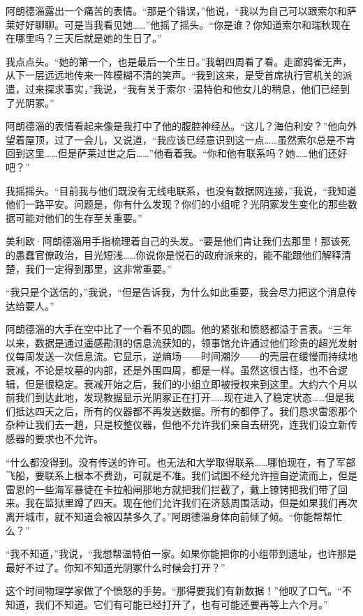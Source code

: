 \documentclass[AutoFakeBold=true]{book}
\begin{document}
阿朗德淄露出一个痛苦的表情。``那是个错误，''他说，``我以为自己可以跟索尔和萨莱好好聊聊。可是当我看见她……''他摇了摇头。``你是谁？你知道索尔和瑞秋现在在哪里吗？{\kaishu 三天}后就是她的生日了。''

我点点头。``她的第一个，也是最后一个生日。''我朝四周看了看。走廊鸦雀无声，从下一层远远地传来一阵模糊不清的笑声。``我到这来，是受首席执行官机关的派遣，过来探求事实，''我说，``我有关于索尔·温特伯和他女儿的稍息，他们已经到了光阴冢。''

阿朗德淄的表情看起来像是我打中了他的腹腔神经丛。``{\kaishu 这儿}？海伯利安？''他向外望着屋顶，过了一会儿，又说道，``我应该已经意识到这一点……虽然索尔总是不肯回到这里……但是萨莱过世之后……''他看着我。``你和他有联系吗？她……他们还好吧？''

我摇摇头。``目前我与他们既没有无线电联系，也没有数据网连接，''我说，``我知道他们一路平安。问题是，你有什么发现？你们的小组呢？光阴冢发生变化的那些数据可能对他们的生存至关重要。''

美利欧·阿朗德淄用手指梳理着自己的头发。``要是他们肯让我们去那里！那该死的愚蠢官僚政治，目光短浅……你说你是悦石的政府派来的，能不能跟他们解释清楚，我们一定得到那里，这非常重要。''

``我只是个送信的，''我说，``但是告诉我，为什么如此重要，我会尽力把这个消息传达给要人。''

阿朗德淄的大手在空中比了一个看不见的圆。他的紧张和愤怒都溢于言表。``三年以来，数据是通过遥感勘测的信息流获知的，领事馆允许通过他们珍贵的超光发射仪每周发送一次信息流。它显示，逆熵场——时间潮汐——的壳层在缓慢而持续地衰减，不论是坟墓的内部，还是外围四周，都是一样。虽然这很古怪，也不合逻辑，但是很稳定。衰减开始之后，我们的小组立即被授权来到这里。大约六个月以前我们到达此地，发现教据显示光阴冢正在打开……现在进入了稳定状态……但是我们抵达四天之后，所有的仪器都不再发送数据。所有的都停了。我们恳求雷恩那个杂种让我们去一趟，只是校整仪器，但他不允许我们亲自去研究，连我们设立新传感器的要求也不允许。

``什么都没得到。没有传送的许可。也无法和大学取得联系……哪怕现在，有了军部飞船，要联系上根本不费劲，可就是不准。我们试图不经允许擅自逆流而上，但是雷恩的一些海军暴徒在卡拉船闸那地方就把我们拦截了，戴上镣铐把我们带了回来。我在监狱里蹲了四天。现在他们允许我们在济慈周围活动，但是如果我们再次离开城市，就不知道会被囚禁多久了。''阿朗德淄身体向前倾了倾。``你{\kaishu 能}帮帮忙么？''

``我不知道，''我说，``我想帮温特伯一家。如果你能把你的小组带到遗址，也许那是最好不过了。你知不知道光阴冢什么时候会打开？''

这个时间物理学家做了个愤怒的手势。``那得要我们有{\kaishu 新}数据！''他叹了口气。``不知道，我们不知道。它们有可能已经打开了，也有可能还要再等上六个月。''
\end{document}
